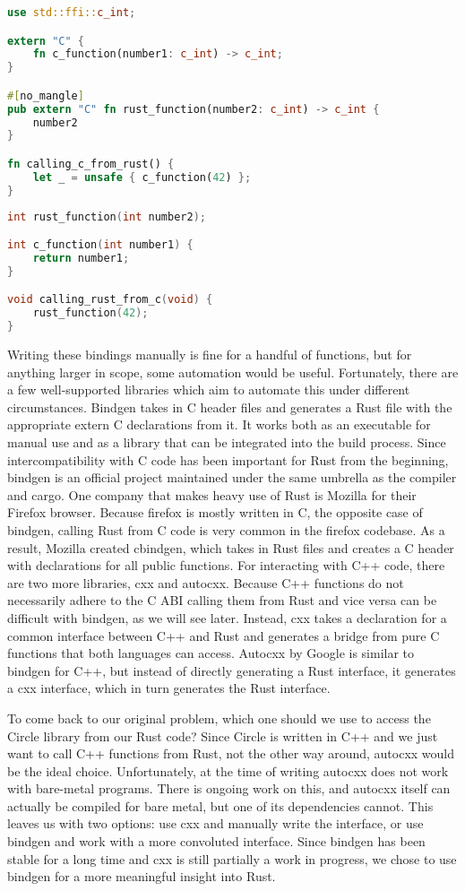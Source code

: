 \begin{lstlisting}[language=Rust,style=colouredRust]
use std::ffi::c_int;

extern "C" {
    fn c_function(number1: c_int) -> c_int;
}

#[no_mangle]
pub extern "C" fn rust_function(number2: c_int) -> c_int {
    number2
}

fn calling_c_from_rust() {
    let _ = unsafe { c_function(42) };
}
\end{lstlisting}

\begin{lstlisting}[language=C]
int rust_function(int number2);

int c_function(int number1) {
    return number1;
}

void calling_rust_from_c(void) {
    rust_function(42);
}
\end{lstlisting}

Writing these bindings manually is fine for a handful of functions, but for anything larger in scope, some automation would be useful.
Fortunately, there are a few well-supported libraries which aim to automate this under different circumstances.
Bindgen takes in C header files and generates a Rust file with the appropriate extern C declarations from it.
It works both as an executable for manual use and as a library that can be integrated into the build process.
Since intercompatibility with C code has been important for Rust from the beginning,
bindgen is an official project maintained under the same umbrella as the compiler and cargo.
One company that makes heavy use of Rust is Mozilla for their Firefox browser.
Because firefox is mostly written in C, the opposite case of bindgen, calling Rust from C code is very common in the firefox codebase.
As a result, Mozilla created cbindgen, which takes in Rust files and creates a C header with declarations for all public functions.
For interacting with C++ code, there are two more libraries, cxx and autocxx.
Because C++ functions do not necessarily adhere to the C ABI calling them from Rust and vice versa can be difficult with bindgen, as we will see later.
Instead, cxx takes a declaration for a common interface between C++ and Rust and generates a bridge from pure C functions that both languages can access.
Autocxx by Google is similar to bindgen for C++, but instead of directly generating a Rust interface, it generates a cxx interface, which in turn generates the Rust interface.

To come back to our original problem, which one should we use to access the Circle library from our Rust code?
Since Circle is written in C++ and we just want to call C++ functions from Rust, not the other way around, autocxx would be the ideal choice.
Unfortunately, at the time of writing autocxx does not work with bare-metal programs.
There is ongoing work on this, and autocxx itself can actually be compiled for bare metal, but one of its dependencies cannot.
This leaves us with two options: use cxx and manually write the interface, or use bindgen and work with a more convoluted interface.
Since bindgen has been stable for a long time and cxx is still partially a work in progress, we chose to use bindgen for a more meaningful insight into Rust.

